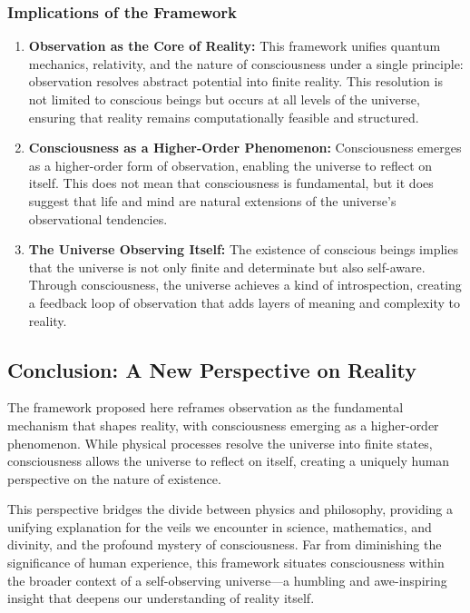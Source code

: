 \documentclass[12pt]{article}
\begin{document}
\subsubsection{Implications of the Framework}

\begin{enumerate}
    \item \textbf{Observation as the Core of Reality:} This framework unifies quantum mechanics, relativity, and the nature of consciousness under a single principle: observation resolves abstract potential into finite reality. This resolution is not limited to conscious beings but occurs at all levels of the universe, ensuring that reality remains computationally feasible and structured.

    \item \textbf{Consciousness as a Higher-Order Phenomenon:} Consciousness emerges as a higher-order form of observation, enabling the universe to reflect on itself. This does not mean that consciousness is fundamental, but it does suggest that life and mind are natural extensions of the universe’s observational tendencies.

    \item \textbf{The Universe Observing Itself:} The existence of conscious beings implies that the universe is not only finite and determinate but also self-aware. Through consciousness, the universe achieves a kind of introspection, creating a feedback loop of observation that adds layers of meaning and complexity to reality.
\end{enumerate}

\subsection{Conclusion: A New Perspective on Reality}

The framework proposed here reframes observation as the fundamental mechanism that shapes reality, with consciousness emerging as a higher-order phenomenon. While physical processes resolve the universe into finite states, consciousness allows the universe to reflect on itself, creating a uniquely human perspective on the nature of existence.

This perspective bridges the divide between physics and philosophy, providing a unifying explanation for the veils we encounter in science, mathematics, and divinity, and the profound mystery of consciousness. Far from diminishing the significance of human experience, this framework situates consciousness within the broader context of a self-observing universe—a humbling and awe-inspiring insight that deepens our understanding of reality itself.
\end{document}
